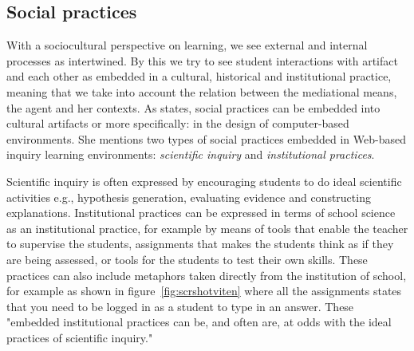 \subsection{Social practices}
With a sociocultural perspective on learning, we see external and internal processes as intertwined. By this we try to see student interactions with artifact and each other as embedded in a cultural, historical and institutional practice, meaning that we take into account the relation between the mediational means, the agent and her contexts. As \citet{furberg2009socio} states, social practices can be embedded into cultural artifacts or more specifically: in the design of computer-based environments. She mentions two types of social practices embedded in Web-based inquiry learning environments: \emph{scientific inquiry} and \emph{institutional practices}.  

Scientific inquiry is often expressed by encouraging students to do ideal scientific activities e.g., hypothesis generation, evaluating evidence and constructing explanations. Institutional practices can be expressed in terms of school science as an institutional practice, for example by means of tools that enable the teacher to supervise the students, assignments that makes the students think as if they are being assessed, or tools for the students to test their own skills. These practices can also include metaphors taken directly from the institution of school, for example as shown in figure~\ref{fig:scrshotviten} where all the assignments states that you need to be logged in as a student to type in an answer. These "embedded institutional practices can be, and often are, at odds with the ideal practices of scientific inquiry." \citetext{\citealp{chinn2002epistemologically}, referenced in \citealp{furberg2009socio}, p. 400}


